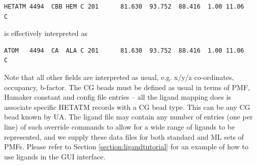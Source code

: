 \documentclass[10pt,a4paper,onecolumn]{report}
\begin{document}
\begin{lstlisting}
HETATM 4494  CBB HEM C 201      81.630  93.752  88.416  1.00 11.06           C
\end{lstlisting}
is effectively interpreted as
\begin{lstlisting}
ATOM   4494  CA  ALA C 201      81.630  93.752  88.416  1.00 11.06           C
\end{lstlisting}
Note that all other fields are interpreted as usual, e.g. x/y/z co-ordinates, occupancy, b-factor. The CG beads must be defined as usual in terms of PMF, Hamaker constant and config file entries -- all the ligand mapping does is associate specific HETATM records with a CG bead type. This can be any CG bead known by UA. The ligand file may contain any number of entries (one per line) of such override commands to allow for a wide range of ligands to be represented, and we supply these data files for both standard and ML sets of PMFs. Please refer to Section \ref{section:ligandtutorial} for an example of how to use ligands in the GUI interface. 
\end{document}
